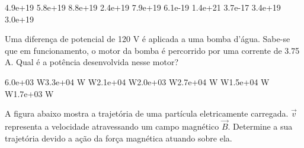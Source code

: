 \documentclass[12pt, addpoints]{exam}
\begin{document}
\begin{questions}
\begin{multicols*}{2}
\begin{oneparchoices}
\choice 4.9e+19 \choice 5.8e+19 \choice 8.8e+19 \choice 2.4e+19 \choice 7.9e+19 \choice 6.1e-19 \choice 1.4e+21 \choice 3.7e-17 \choice 3.4e+19 \choice 3.0e+19 
\end{oneparchoices}\question Uma diferença de potencial de 120 V é aplicada a uma bomba d’água. Sabe-se que em funcionamento, o motor da bomba é percorrido por uma corrente de    3.75 A. Qual é a potência desenvolvida nesse motor?

\begin{oneparchoices}
\choice 6.0e+03 W\choice 3.3e+04 W W\choice 2.1e+04 W\choice 2.0e+03 W\choice 2.7e+04 W W\choice 1.5e+04 W W\choice 1.7e+03 W
\end{oneparchoices}\question A ﬁgura abaixo mostra a trajetória de uma partícula eletricamente carregada. $\vec{{v}}$ representa a velocidade atravessando um campo magnético $\vec{{B}}$. Determine a sua trajetória devido a ação da força magnética atuando sobre ela.
        
        \begin{center}
            \begin{minipage}[c]{0.5\linewidth}
            \end{minipage}
        \end{center}

        


\end{multicols*}
\end{questions}
\end{document}
